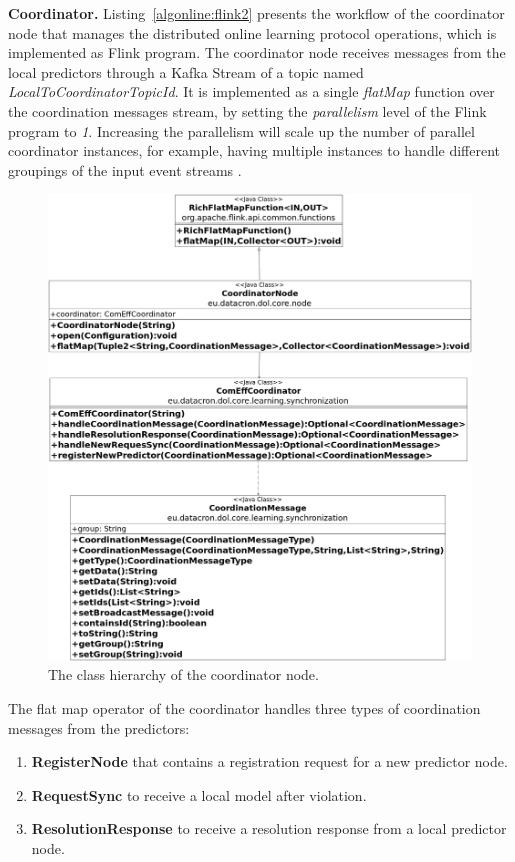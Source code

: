 \textbf{Coordinator.} Listing~\ref{algonline:flink2} presents the workflow of the coordinator node that manages the distributed online learning protocol operations, which is implemented as Flink program. The coordinator node receives messages from the local predictors through a Kafka Stream of a topic named \textit{LocalToCoordinatorTopicId}. It is implemented as a single \textit{flatMap} function over the coordination messages stream, by setting the \textit{parallelism} level of the Flink program to \textit{1}. Increasing the parallelism will scale up the number of parallel coordinator instances, for example, having multiple instances to handle different groupings of the input event streams . 

	

\begin{figure}[H]
	\centering
	\includegraphics[width=\textwidth,keepaspectratio]{chapters/figures/coordinator_diagram.png}
	
	\caption{The class hierarchy of the coordinator node.}
	\label{fig:coord_class_diagram}
\end{figure}

\par The flat map operator of the coordinator handles three types of coordination messages from the predictors: 
\begin{enumerate}[]
	\item \textbf{RegisterNode} that contains a registration request for a new predictor node.
	\item \textbf{RequestSync} to receive a local model after violation.
	\item \textbf{ResolutionResponse} to receive a resolution response from a local predictor node.  
\end{enumerate}  

